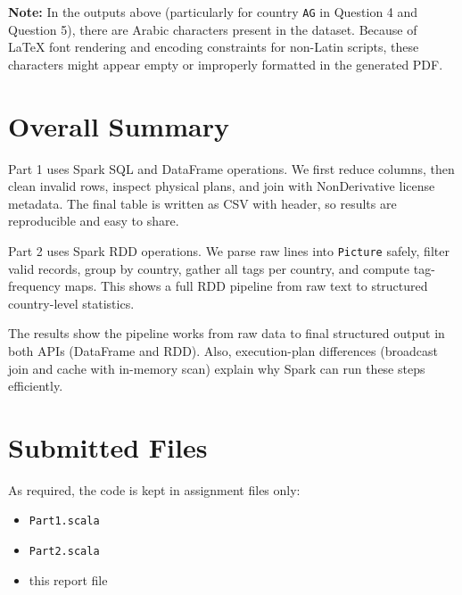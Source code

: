 \documentclass[11pt]{article}
\begin{document}
\textbf{Note:} In the outputs above (particularly for country \texttt{AG} in Question 4 and Question 5), there are Arabic characters present in the dataset. Because of LaTeX font rendering and encoding constraints for non-Latin scripts, these characters might appear empty or improperly formatted in the generated PDF.

\section*{Overall Summary}
Part 1 uses Spark SQL and DataFrame operations. We first reduce columns, then clean invalid rows, inspect physical plans, and join with NonDerivative license metadata. The final table is written as CSV with header, so results are reproducible and easy to share.

Part 2 uses Spark RDD operations. We parse raw lines into \texttt{Picture} safely, filter valid records, group by country, gather all tags per country, and compute tag-frequency maps. This shows a full RDD pipeline from raw text to structured country-level statistics.

The results show the pipeline works from raw data to final structured output in both APIs (DataFrame and RDD). Also, execution-plan differences (broadcast join and cache with in-memory scan) explain why Spark can run these steps efficiently.

\section*{Submitted Files}
As required, the code is kept in assignment files only:
\begin{itemize}
  \item \texttt{Part1.scala}
  \item \texttt{Part2.scala}
  \item this report file
\end{itemize}
\end{document}
